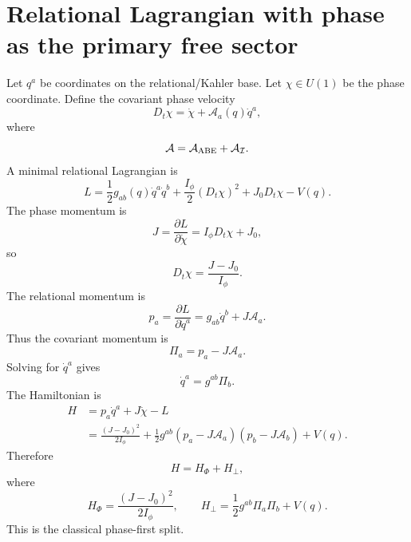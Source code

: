 \documentclass[11pt,a4paper]{article}
\begin{document}
\section{Relational Lagrangian with phase as the primary free sector}
Let $q^a$ be coordinates on the relational/Kahler base.  Let $\chi\in U(1)$ be the phase coordinate.  Define the covariant phase velocity
\begin{equation}
\boxed{D_t\chi=\dot\chi+\mathcal A_a(q)\dot q^a,}
\end{equation}
where
\begin{equation}
\mathcal A=\mathcal A_{\rm ABE}+\mathcal A_{\mathcal I}.
\end{equation}
A minimal relational Lagrangian is
\begin{equation}
\boxed{L=\frac12g_{ab}(q)\dot q^a\dot q^b+\frac{I_\phi}{2}(D_t\chi)^2+J_0D_t\chi-V(q).}
\end{equation}
The phase momentum is
\begin{equation}
J=\frac{\partial L}{\partial\dot\chi}=I_\phi D_t\chi+J_0,
\end{equation}
so
\begin{equation}
D_t\chi=\frac{J-J_0}{I_\phi}.
\end{equation}
The relational momentum is
\begin{equation}
p_a=\frac{\partial L}{\partial\dot q^a}=g_{ab}\dot q^b+J\mathcal A_a.
\end{equation}
Thus the covariant momentum is
\begin{equation}
\boxed{\Pi_a=p_a-J\mathcal A_a.}
\end{equation}
Solving for $\dot q^a$ gives
\begin{equation}
\dot q^a=g^{ab}\Pi_b.
\end{equation}
The Hamiltonian is
\begin{align}
H&=p_a\dot q^a+J\dot\chi-L\\
&=\frac{(J-J_0)^2}{2I_\phi}+\frac12g^{ab}(p_a-J\mathcal A_a)(p_b-J\mathcal A_b)+V(q).
\end{align}
Therefore
\begin{equation}
\boxed{H=H_\Phi+H_\perp,}
\end{equation}
where
\begin{equation}
\boxed{H_\Phi=\frac{(J-J_0)^2}{2I_\phi},\qquad H_\perp=\frac12g^{ab}\Pi_a\Pi_b+V(q).}
\end{equation}
This is the classical phase-first split.
\end{document}
